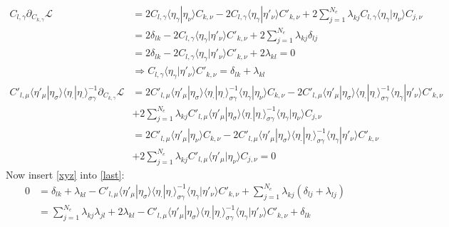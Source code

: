 \begin{align}
    C_{l,\gamma}\partial_{C_{k,\gamma}}\mathcal{L} &= 2 C_{l,\gamma}\langle \eta_\gamma|\eta_\nu \rangle C_{k,\nu} - 2 C_{l,\gamma} \langle \eta_\gamma|\eta'_\nu \rangle C'_{k,\nu} + 2 \sum\limits_{j=1}^{N_e} \lambda_{kj} C_{l,\gamma}  \langle \eta_\gamma|\eta_\nu \rangle  C_{j,\nu} \\
    &= 2 \delta_{lk} - 2 C_{l,\gamma} \langle \eta_\gamma|\eta'_\nu \rangle C'_{k,\nu} + 2 \sum\limits_{j=1}^{N_e} \lambda_{kj} \delta_{lj}\\
    &=2 \delta_{lk} - 2 C_{l,\gamma} \langle \eta_\gamma|\eta'_\nu \rangle C'_{k,\nu} + 2 \lambda_{kl}= 0\\
        &\Rightarrow C_{l,\gamma} \langle \eta_\gamma|\eta'_\nu \rangle C'_{k,\nu} = \delta_{lk} + \lambda_{kl}\label{xyz}\\
    C'_{l,\mu} \langle \eta'_\mu|\eta_\sigma \rangle\langle \eta_\cdot|\eta_\cdot \rangle^{-1}_{\sigma\gamma}\partial_{C_{k,\gamma}}\mathcal{L} &= 2 C'_{l,\mu} \langle \eta'_\mu|\eta_\sigma \rangle\langle \eta_\cdot|\eta_\cdot \rangle^{-1}_{\sigma\gamma}\langle \eta_\gamma|\eta_\nu \rangle C_{k,\nu} - 2 C'_{l,\mu} \langle \eta'_\mu|\eta_\sigma \rangle\langle \eta_\cdot|\eta_\cdot \rangle^{-1}_{\sigma\gamma} \langle \eta_\gamma|\eta'_\nu \rangle C'_{k,\nu}\\
    &+ 2 \sum\limits_{j=1}^{N_e} \lambda_{kj} C'_{l,\mu} \langle \eta'_\mu|\eta_\sigma \rangle\langle \eta_\cdot|\eta_\cdot \rangle^{-1}_{\sigma\gamma} \langle \eta_\gamma|\eta_\nu \rangle  C_{j,\nu} \\
    &=2 C'_{l,\mu} \langle \eta'_\mu|\eta_\nu \rangle C_{k,\nu} - 2 C'_{l,\mu} \langle \eta'_\mu|\eta_\sigma \rangle\langle \eta_\cdot|\eta_\cdot \rangle^{-1}_{\sigma\gamma} \langle \eta_\gamma|\eta'_\nu \rangle C'_{k,\nu}\\
    &+ 2 \sum\limits_{j=1}^{N_e} \lambda_{kj} C'_{l,\mu} \langle \eta'_\mu|\eta_\nu \rangle  C_{j,\nu} =0\label{last}
    \end{align}
Now insert \eqref{xyz} into \eqref{last}:
\begin{align}
    0&=\delta_{lk} + \lambda_{kl} - C'_{l,\mu} \langle \eta'_\mu|\eta_\sigma \rangle\langle \eta_\cdot|\eta_\cdot \rangle^{-1}_{\sigma\gamma} \langle \eta_\gamma|\eta'_\nu \rangle C'_{k,\nu} + \sum\limits_{j=1}^{N_e} \lambda_{kj} \left(\delta_{lj} + \lambda_{lj}\right) \\
    &= \sum\limits_{j=1}^{N_e} \lambda_{kj}\lambda_{jl} +2\lambda_{kl} - C'_{l,\mu} \langle \eta'_\mu|\eta_\sigma \rangle\langle \eta_\cdot|\eta_\cdot \rangle^{-1}_{\sigma\gamma} \langle \eta_\gamma|\eta'_\nu \rangle C'_{k,\nu} + \delta_{lk}
\end{align}
